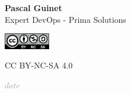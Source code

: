 \documentclass[12pt,a4paper]{article}
\begin{document}
\vspace{\fill}

\begin{center}
\begin{tcolorbox}[colback=white, colframe=darkgray, width=10cm, arc=3mm]
    \centering
    
    \textbf{Pascal Guinet}\\
    Expert DevOps - Prima Solutions
    
    \vspace{0.3cm}
    
    \includegraphics[width=2cm]{ressources/images/licenses/cc-by-nc-sa.png}
    
    {\small CC BY-NC-SA 4.0}
\end{tcolorbox}
\end{center}

\vspace{0.5cm}

\begin{center}
    \textcolor{darkgray}{\large $date$}
\end{center}
\end{document}
